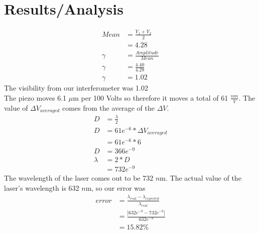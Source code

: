 \section{Results/Analysis}
\begin{align*}
	Mean &= \frac{Y_1 + Y_2}{2} \\
		 &= 4.28 \\
    \gamma &= \frac{Amplitude}{Mean} \\
	\gamma &= \frac{4.40}{4.28} \\
	\gamma &= 1.02
\end{align*} 
The visibility from our interferometer was 1.02 \\
The piezo moves 6.1 $\mu$m per 100 Volts so therefore it moves a total of 61 $\frac{nm}{V}$.
The value of $\Delta V_{averaged}$ comes from the average of the $\Delta V$.
\begin{align*}
	D &= \frac{\lambda}{2} \\
	D &= 61e^{-6} * \Delta V_{averaged} \\
	  &= 61e^{-6} * 6 \\
	D &= 366e^{-9} \\
	\lambda &= 2*D \\
	 &= 732e^{-9}	
\end{align*}
The wavelength of the laser comes out to be 732 $n$m. The actual value of the laser's wavelength is 632 $n$m, so our error was 
	\begin{align*}
		error &=\frac{\lambda_{real}-\lambda_{expected}}{\lambda_{real}} \\
			&= \frac{|632e^{-9}-732e^{-9}|}{632e^{-9}}	\\	
			&= 15.82 \%
	\end{align*}
